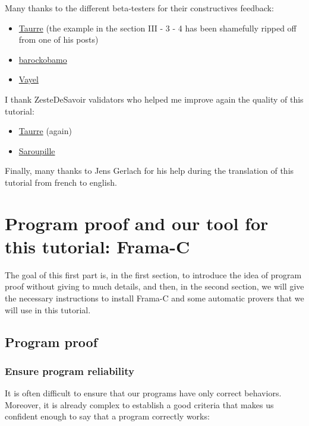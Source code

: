 \documentclass[12pt,francais,]{scrbook}
\newenvironment{zdsblock}[1]{%
  \tcolorbox[beamer,%
    noparskip,breakable,
    colback=LightBlue,colframe=DarkBlue,%
    colbacklower=DarkBlue,%
    title=#1]
}{\endtcolorbox}
\begin{document}
\begin{zdsblock}{Information}
  Many thanks to the different beta-testers for their constructives
  feedback:
  \begin{itemize}
  \item \href{https://zestedesavoir.com/membres/voir/Taurre/}{Taurre} (the
    example in the section III - 3 - 4 has been shamefully ripped
    off from one of his posts)
  \item \href{https://zestedesavoir.com/membres/voir/barockobamo/}{barockobamo}
  \item \href{https://zestedesavoir.com/membres/voir/Vayel/}{Vayel}
  \end{itemize}
  I thank ZesteDeSavoir validators who helped me improve again the quality of
  this tutorial:
  \begin{itemize}
  \item \href{https://zestedesavoir.com/membres/voir/Taurre/}{Taurre} (again)
  \item \href{https://zestedesavoir.com/membres/voir/Saroupille/}{Saroupille}
  \end{itemize}
  Finally, many thanks to Jens Gerlach for his help during the translation of
  this tutorial from french to english.
\end{zdsblock}

\chapter{Program proof and our tool for this tutorial:
Frama-C}\label{program-proof-and-our-tool-for-this-tutorial-frama-c}

The goal of this first part is, in the first section, to introduce the
idea of program proof without giving to much details, and then, in the
second section, we will give the necessary instructions to install
Frama-C and some automatic provers that we will use in this tutorial.

\section{Program proof}\label{program-proof}

\subsection{Ensure program
reliability}\label{ensure-program-reliability}

It is often difficult to ensure that our programs have only correct
behaviors. Moreover, it is already complex to establish a good criteria
that makes us confident enough to say that a program correctly works:
\end{document}
